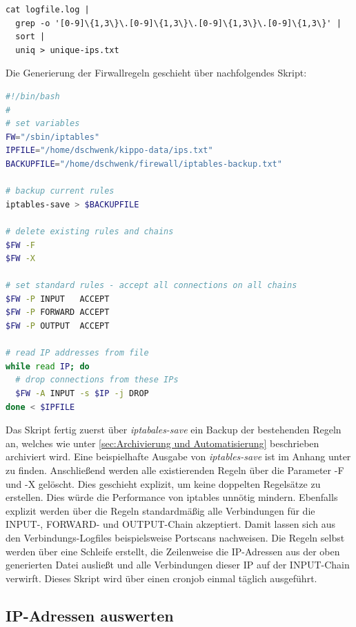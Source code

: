 \begin{lstlisting}[style=customc]
cat logfile.log | 
  grep -o '[0-9]\{1,3\}\.[0-9]\{1,3\}\.[0-9]\{1,3\}\.[0-9]\{1,3\}' |
  sort |
  uniq > unique-ips.txt
\end{lstlisting}

Die Generierung der Firwallregeln geschieht über nachfolgendes Skript:

\begin{lstlisting}[language=bash,style=customccolor]
#!/bin/bash
#
# set variables
FW="/sbin/iptables"
IPFILE="/home/dschwenk/kippo-data/ips.txt"
BACKUPFILE="/home/dschwenk/firewall/iptables-backup.txt"

# backup current rules
iptables-save > $BACKUPFILE

# delete existing rules and chains
$FW -F
$FW -X

# set standard rules - accept all connections on all chains
$FW -P INPUT   ACCEPT
$FW -P FORWARD ACCEPT
$FW -P OUTPUT  ACCEPT

# read IP addresses from file
while read IP; do
  # drop connections from these IPs
  $FW -A INPUT -s $IP -j DROP 
done < $IPFILE


\end{lstlisting}

Das Skript fertig zuerst über \textit{iptabales-save} ein Backup der bestehenden Regeln an, welches wie unter \ref{sec:Archivierung und Automatisierung} beschrieben archiviert wird. Eine beispielhafte Ausgabe von \textit{iptables-save} ist im Anhang unter \textit{} zu finden. Anschließend werden alle existierenden Regeln über die Parameter -F und -X gelöscht. Dies geschieht explizit, um keine doppelten Regelsätze zu erstellen. Dies würde die Performance von iptables unnötig mindern. Ebenfalls explizit werden über die Regeln standardmäßig alle Verbindungen für die INPUT-, FORWARD- und OUTPUT-Chain akzeptiert. Damit lassen sich aus den Verbindungs-Logfiles beispielsweise Portscans nachweisen. Die Regeln selbst werden über eine Schleife erstellt, die Zeilenweise die IP-Adressen aus der oben generierten Datei ausließt und alle Verbindungen dieser IP auf der INPUT-Chain verwirft. Dieses Skript wird über einen cronjob einmal täglich ausgeführt.



\subsection{IP-Adressen auswerten}
\label{subsec:IP-Adressen auswerten}

